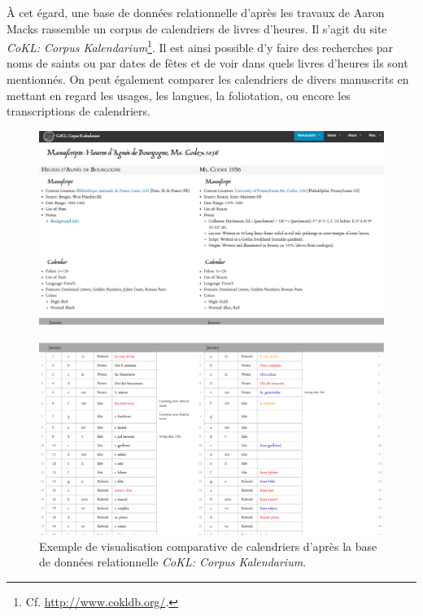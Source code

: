 \documentclass[a4paper,12pt,twoside]{book}
\begin{document}
    À cet égard, une base de données relationnelle d'après les travaux de Aaron Macks rassemble un corpus de calendriers de livres d’heures. Il s'agit du site \textit{CoKL: Corpus Kalendarium}\footnote{Cf. \url{http://www.cokldb.org/}.}. Il est ainsi possible d'y faire des recherches par noms de saints ou par dates de fêtes et de voir dans quels livres d’heures ils sont mentionnés. On peut également comparer les calendriers de divers manuscrits en mettant en regard les usages, les langues, la foliotation, ou encore les transcriptions de calendriers.
    
    \begin{figure}[!h]
    \centering
    \includegraphics[width=13cm]{img/DataViz/CoKL1.png}
    \end{figure}
    
    \begin{figure}[!h]
    \centering
    \includegraphics[width=13cm]{img/DataViz/CoKL2.png}
    \caption{Exemple de visualisation comparative de calendriers d'après la base de données relationnelle \textit{CoKL: Corpus Kalendarium}.}
    \end{figure}
    
\end{document}
